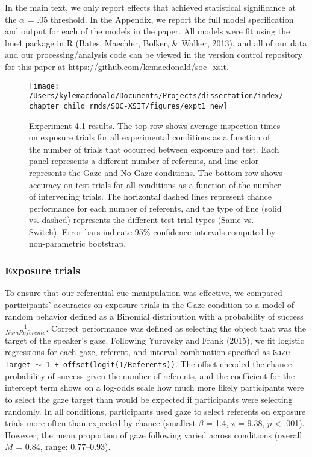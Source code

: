\documentclass[oneside]{report}
\begin{document}
In the main text, we only report effects that achieved statistical
significance at the \(\alpha\) = .05 threshold. In the Appendix, we
report the full model specification and output for each of the models in
the paper. All models were fit using the lme4 package in R (Bates,
Maechler, Bolker, \& Walker, 2013), and all of our data and our
processing/analysis code can be viewed in the version control repository
for this paper at \url{https://github.com/kemacdonald/soc_xsit}.
\begin{figure}[!t]

{\centering \texttt{[image: /Users/kylemacdonald/Documents/Projects/dissertation/index/chapter\_child\_rmds/SOC-XSIT/figures/expt1\_new]} 

}

\caption[Experiment 4.1 results.]{Experiment 4.1 results. The top row shows average inspection times on exposure trials for all experimental conditions as a function of the number of trials that occurred between exposure and test. Each panel represents a different number of referents, and line color represents the Gaze and No-Gaze conditions. The bottom row shows accuracy on test trials for all conditions as a function of the number of intervening trials. The horizontal dashed lines represent chance performance for each number of referents, and the type of line (solid vs. dashed) represents the different test trial types (Same vs. Switch). Error bars indicate 95\% confidence intervals computed by non-parametric bootstrap.}\label{fig:expt1-plot}
\end{figure}
\subsubsection{Exposure trials}\label{exposure-trials}

To ensure that our referential cue manipulation was effective, we
compared participants' accuracies on exposure trials in the Gaze
condition to a model of random behavior defined as a Binomial
distribution with a probability of success \(\frac{1}{Num Referents}\).
Correct performance was defined as selecting the object that was the
target of the speaker's gaze. Following Yurovsky and Frank (2015), we
fit logistic regressions for each gaze, referent, and interval
combination specified as
\texttt{Gaze Target $\sim$ 1 + offset(logit(1/Referents))}. The offset
encoded the chance probability of success given the number of referents,
and the coefficient for the intercept term shows on a log-odds scale how
much more likely participants were to select the gaze target than would
be expected if participants were selecting randomly. In all conditions,
participants used gaze to select referents on exposure trials more often
than expected by chance (smallest \(\beta\) = 1.4, z = 9.38, \(p\)
\textless{} .001). However, the mean proportion of gaze following varied
across conditions (overall \(M\) = 0.84, range: 0.77--0.93).
\end{document}
